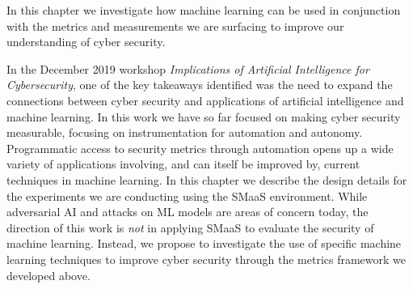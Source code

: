 


In this chapter we investigate how machine learning can be used in conjunction with the metrics and measurements we are surfacing to improve our understanding of cyber security. 

 



In the December 2019 workshop\textit{ Implications of Artificial Intelligence for Cybersecurity}\cite{Chang_2019}, one of the key takeaways identified was the need to expand the connections between cyber security and applications of artificial intelligence and machine learning. In this work we have so far focused on making cyber security measurable, focusing on instrumentation for automation and autonomy. Programmatic access to security metrics through automation opens up a wide variety of applications involving, and can itself be improved by, current techniques in machine learning. In this chapter we describe the design details for the experiments we are conducting using the SMaaS environment. While adversarial AI and attacks on ML models are areas of concern today, the direction of this work is \textit{not} in applying SMaaS to evaluate the security of machine learning. Instead, we propose to investigate the use of specific machine learning techniques to improve cyber security through the metrics framework we developed above. 
